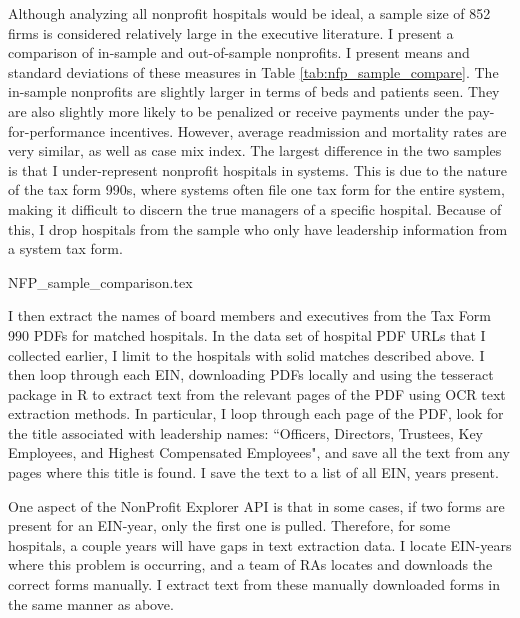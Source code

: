 \documentclass[12pt]{article}
\begin{document}
Although analyzing all nonprofit hospitals would be ideal, a sample size of 852 firms is considered relatively large in the executive literature. I present a comparison of in-sample and out-of-sample nonprofits. I present means and standard deviations of these measures in Table \ref{tab:nfp_sample_compare}. The in-sample nonprofits are slightly larger in terms of beds and patients seen. They are also slightly more likely to be penalized or receive payments under the pay-for-performance incentives. However, average readmission and mortality rates are very similar, as well as case mix index. The largest difference in the two samples is that I under-represent nonprofit hospitals in systems. This is due to the nature of the tax form 990s, where systems often file one tax form for the entire system, making it difficult to discern the true managers of a specific hospital. Because of this, I drop hospitals from the sample who only have leadership information from a system tax form. 

{NFP_sample_comparison.tex}

I then extract the names of board members and executives from the Tax Form 990 PDFs for matched hospitals. In the data set of hospital PDF URLs that I collected earlier, I limit to the hospitals with solid matches described above. I then loop through each EIN, downloading PDFs locally and using the tesseract package in R to extract text from the relevant pages of the PDF using OCR text extraction methods. In particular, I loop through each page of the PDF, look for the title associated with leadership names: ``Officers, Directors, Trustees, Key Employees, and Highest Compensated Employees", and save all the text from any pages where this title is found. I save the text to a list of all EIN, years present. 

One aspect of the NonProfit Explorer API is that in some cases, if two forms are present for an EIN-year, only the first one is pulled. Therefore, for some hospitals, a couple years will have gaps in text extraction data. I locate EIN-years where this problem is occurring, and a team of RAs locates and downloads the correct forms manually. I extract text from these manually downloaded forms in the same manner as above. 
\end{document}
